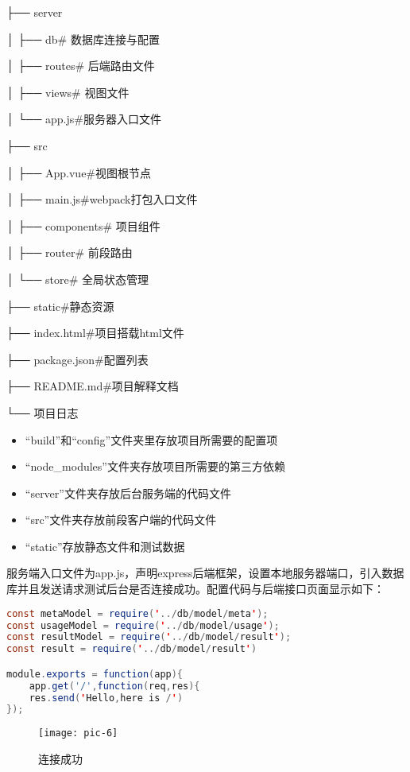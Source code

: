 ├── server

│   ├── db\# 数据库连接与配置

│   ├── routes\# 后端路由文件

│   ├── views\# 视图文件

│   └── app.js\#服务器入口文件

├── src

│   ├── App.vue\#视图根节点

│   ├── main.js\#webpack打包入口文件

│   ├── components\# 项目组件

│   ├── router\# 前段路由

│   └── store\# 全局状态管理

├── static\#静态资源

├── index.html\#项目搭载html文件

├── package.json\#配置列表

├── README.md\#项目解释文档

└── 项目日志

\begin{itemize}
	\item “build”和“config”文件夹里存放项目所需要的配置项
	\item “node\_modules”文件夹存放项目所需要的第三方依赖
	\item “server”文件夹存放后台服务端的代码文件
	\item “src”文件夹存放前段客户端的代码文件
	\item “static”存放静态文件和测试数据
\end{itemize}

服务端入口文件为app.js，声明express后端框架，设置本地服务器端口，引入数据库并且发送请求测试后台是否连接成功。配置代码与后端接口页面显示如下：

\begin{lstlisting}[caption=配置前后端服务器,frame=shadowbox,language={java}]
const metaModel = require('../db/model/meta');
const usageModel = require('../db/model/usage');
const resultModel = require('../db/model/result');
const result = require('../db/model/result')

module.exports = function(app){
	app.get('/',function(req,res){
	res.send('Hello,here is /')
});

\end{lstlisting}

\begin{figure}[htb]
	\centering
	\texttt{[image: pic-6]}
	\caption{连接成功}
	\label{pic-6}
\end{figure}

